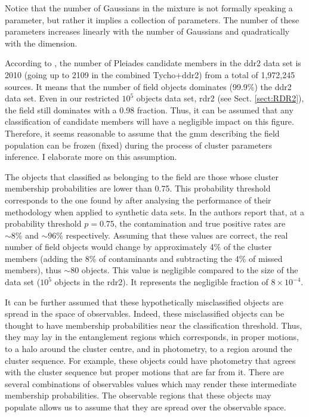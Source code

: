 {Notice that the number of Gaussians in the mixture is not formally speaking a parameter, but rather it implies a collection of parameters. The number of these parameters increases linearly with the number of Gaussians and quadratically with the dimension.} 

According to \citet{Bouy2015}, the number of Pleiades candidate members in the \gls{ddr2} data set is 2010 (going up to 2109 in the combined Tycho+\gls{ddr2}) from a total of 1,972,245 sources. It means that the number of field objects dominates (99.9\%) the \gls{ddr2} data set. Even in our restricted $10^5$ objects data set, \gls{rdr2} (see Sect. \ref{sect:RDR2}), the field still dominates with a 0.98 fraction. Thus, it can be assumed that any classification of candidate members will have a negligible impact on this figure. Therefore, it seems reasonable to assume that the \gls{gmm} describing the field population can be frozen (fixed) during the process of cluster parameters inference. I elaborate more on this assumption.


The objects that \citet{Bouy2015} classified as belonging to the field are those whose cluster membership probabilities are lower than 0.75. This probability threshold corresponds to the one found by \citet{Sarro2014} after analysing the performance of their methodology when applied to synthetic data sets. In \citet{Sarro2014} the authors report that, at a probability threshold $p=0.75$, the contamination and true positive rates are $\sim 8\%$ and $ \sim96\%$ respectively. Assuming that these values are correct, the real number of field objects would change by approximately 4\% of the cluster members (adding the 8\% of contaminants and subtracting the 4\% of missed members), thus $\sim 80$ objects. This value is negligible compared to the size of the data set ($10^5$ objects in the \gls{rdr2}). It represents the negligible fraction of $ 8\times10^{-4}$. 

It can be further assumed that these hypothetically misclassified objects are spread in the space of observables. Indeed, these misclassified objects can be thought to have membership probabilities near the classification threshold. Thus, they may lay in the entanglement regions which corresponds, in proper motions, to a halo around the cluster centre, and in photometry, to a region around the cluster sequence. For example, these objects could have photometry that agrees with the cluster sequence but proper motions that are far from it. There are several combinations of observables values which may render these intermediate membership probabilities. The observable regions that these objects may populate allows us to assume that they are spread over the observable space. 

